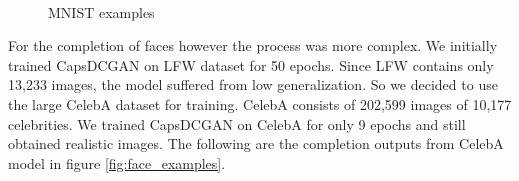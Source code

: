 \begin{figure}[H]
    \\
    \centering
    \caption{MNIST examples}%
    \label{fig:mnist_examples}%
\end{figure}
For the completion of faces however the process was more complex. We initially trained CapsDCGAN on LFW dataset \cite{lfw} for 50 epochs. Since LFW contains only 13,233 images, the model suffered from low generalization. So we decided to use the large CelebA dataset \cite{celeba} for training. CelebA consists of 202,599 images of 10,177 celebrities. We trained CapsDCGAN on CelebA for only 9 epochs and still obtained realistic images. The following are the completion outputs from CelebA model in figure \ref{fig:face_examples}.
